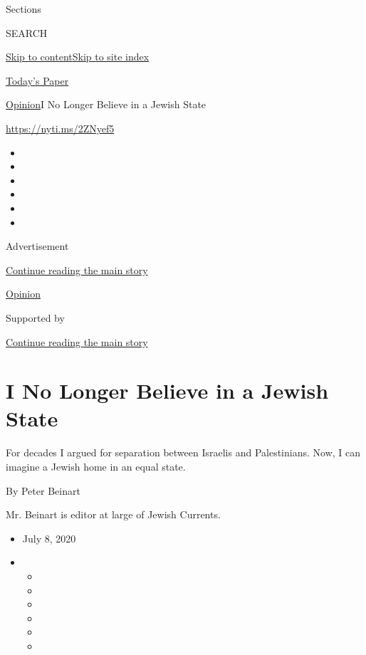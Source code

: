 Sections

SEARCH

\protect\hyperlink{site-content}{Skip to
content}\protect\hyperlink{site-index}{Skip to site index}

\href{https://myaccount.nytimes.com/auth/login?response_type=cookie\&client_id=vi}{}

\href{https://www.nytimes.com/section/todayspaper}{Today's Paper}

\href{/section/opinion}{Opinion}\textbar{}I No Longer Believe in a
Jewish State

\url{https://nyti.ms/2ZNyef5}

\begin{itemize}
\item
\item
\item
\item
\item
\item
\end{itemize}

Advertisement

\protect\hyperlink{after-top}{Continue reading the main story}

\href{/section/opinion}{Opinion}

Supported by

\protect\hyperlink{after-sponsor}{Continue reading the main story}

\hypertarget{i-no-longer-believe-in-a-jewish-state}{%
\section{I No Longer Believe in a Jewish
State}\label{i-no-longer-believe-in-a-jewish-state}}

For decades I argued for separation between Israelis and Palestinians.
Now, I can imagine a Jewish home in an equal state.

By Peter Beinart

Mr. Beinart is editor at large of Jewish Currents.

\begin{itemize}
\item
  July 8, 2020
\item
  \begin{itemize}
  \item
  \item
  \item
  \item
  \item
  \item
  \end{itemize}
\end{itemize}

